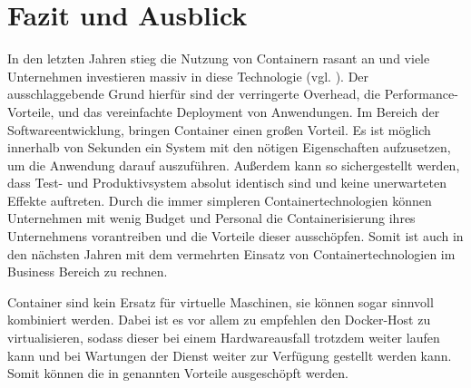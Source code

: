 \section{Fazit und Ausblick} 
\label{sec:Fazit}
In den letzten Jahren stieg die Nutzung von Containern rasant an und viele Unternehmen investieren massiv in diese Technologie (vgl. ). Der ausschlaggebende Grund hierfür sind der verringerte Overhead, die Performance-Vorteile, und das vereinfachte Deployment von Anwendungen.  Im Bereich der Softwareentwicklung, bringen Container einen großen Vorteil. Es ist möglich innerhalb von Sekunden ein System mit den nötigen Eigenschaften aufzusetzen, um die Anwendung darauf auszuführen. Außerdem kann so sichergestellt werden, dass Test- und Produktivsystem absolut identisch sind und keine unerwarteten Effekte auftreten. Durch die immer simpleren Containertechnologien können Unternehmen mit wenig Budget und Personal die Containerisierung ihres Unternehmens vorantreiben und die Vorteile dieser ausschöpfen. Somit ist auch in den nächsten Jahren mit dem vermehrten Einsatz von Containertechnologien im Business Bereich zu rechnen. 

Container sind kein Ersatz für virtuelle Maschinen, sie können sogar sinnvoll kombiniert werden. Dabei ist es vor allem zu empfehlen den Docker-Host zu virtualisieren, sodass dieser bei einem Hardwareausfall trotzdem weiter laufen kann und bei Wartungen der Dienst weiter zur Verfügung gestellt werden kann. Somit können die in  genannten Vorteile ausgeschöpft werden.

